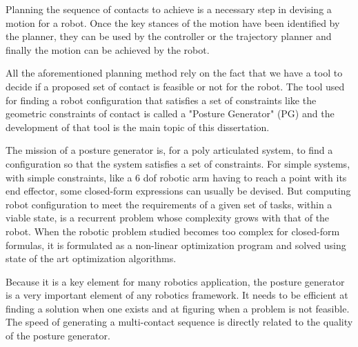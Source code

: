 Planning the sequence of contacts to achieve is a necessary step in devising a motion for a robot.
Once the key stances of the motion have been identified by the planner, they can be used by the controller or the trajectory planner and finally the motion can be achieved by the robot.

All the aforementioned planning method rely on the fact that we have a tool to decide if a proposed set of contact is feasible or not for the robot.
The tool used for finding a robot configuration that satisfies a set of constraints like the geometric constraints of contact is called a "Posture Generator" (PG) and the development of that tool is the main topic of this dissertation.

The mission of a posture generator is, for a poly articulated system, to find a configuration so that the system satisfies a set of constraints.
For simple systems, with simple constraints, like a 6 dof robotic arm having to reach a point with its end effector, some closed-form expressions can usually be devised.
But computing robot configuration to meet the requirements of a given set of tasks, within a viable state, is a recurrent problem whose complexity grows with that of the robot.
When the robotic problem studied becomes too complex for closed-form formulas, it is formulated as a non-linear optimization program and solved using state of the art optimization algorithms.

Because it is a key element for many robotics application, the posture generator is a very important element of any robotics framework.
It needs to be efficient at finding a solution when one exists and at figuring when a problem is not feasible.
The speed of generating a multi-contact sequence is directly related to the quality of the posture generator.

